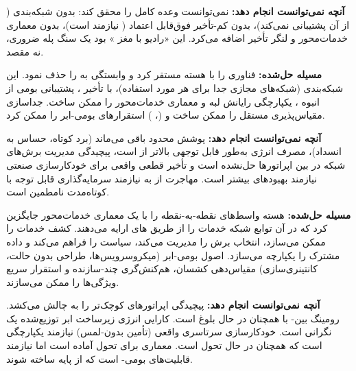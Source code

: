 \textbf{آنچه نمی‌توانست انجام دهد:}  نمی‌توانست وعده کامل  را محقق کند: بدون شبکه‌بندی ( از آن پشتیبانی نمی‌کند)، بدون کم-تأخیر فوق‌قابل اعتماد ( نیازمند  است)، بدون معماری خدمات‌محور و لنگر  تأخیر اضافه می‌کرد. این «رادیو  با مغز » بود  یک سنگ پله ضروری، نه مقصد.


\textbf{مسیله حل‌شده:}  فناوری  را با هسته  مستقر کرد و وابستگی به  را حذف نمود. این شبکه‌بندی (شبکه‌های مجازی جدا برای هر مورد استفاده)،  با تأخیر ، پشتیبانی بومی از  انبوه ، یکپارچگی رایانش لبه  و معماری خدمات‌محور را ممکن ساخت. جداسازی  مقیاس‌پذیری مستقل را ممکن ساخت و  (، ) استقرارهای بومی-ابر را ممکن کرد.

\textbf{آنچه نمی‌توانست انجام دهد:} پوشش  محدود باقی می‌ماند (برد کوتاه، حساس به انسداد)، مصرف انرژی به‌طور قابل توجهی بالاتر از  است، پیچیدگی مدیریت برش‌های شبکه در بین اپراتورها حل‌نشده است و تأخیر قطعی واقعی برای خودکارسازی صنعتی نیازمند بهبودهای بیشتر است. مهاجرت از  به  نیازمند سرمایه‌گذاری قابل توجه با  کوتاه‌مدت نامطمین است.


\textbf{مسیله حل‌شده:} هسته  واسط‌های نقطه-به-نقطه را با یک معماری خدمات‌محور جایگزین کرد که در آن توابع شبکه  خدمات را از طریق های  ارایه می‌دهند.  کشف خدمات را ممکن می‌سازد،  انتخاب برش را مدیریت می‌کند،  سیاست را فراهم می‌کند و  داده مشترک را یکپارچه می‌سازد. اصول بومی-ابر (میکروسرویس‌ها، طراحی بدون حالت، کانتینری‌سازی) مقیاس‌دهی کشسان، هم‌کنش‌گری چند-سازنده و استقرار سریع ویژگی‌ها را ممکن می‌سازند.

\textbf{آنچه نمی‌توانست انجام دهد:} پیچیدگی  اپراتورهای کوچک‌تر را به چالش می‌کشد. رومینگ بین- با  همچنان در حال بلوغ است. کارایی انرژی زیرساخت ابر توزیع‌شده یک نگرانی است. خودکارسازی سرتاسری واقعی (تأمین بدون-لمس) نیازمند یکپارچگی  است که همچنان در حال تحول است. معماری برای تحول  آماده است اما نیازمند قابلیت‌های بومی- است که از پایه ساخته شوند.

